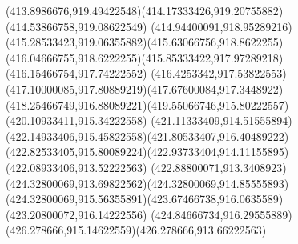 {{{{				\curveto(413.8986676,919.49422548)(414.17333426,919.20755882)(414.53866758,919.08622549)
				\curveto(414.94400091,918.95289216)(415.28533423,919.06355882)(415.63066756,918.8622255)
				\curveto(416.04666755,918.6222255)(415.85333422,917.97289218)(416.15466754,917.74222552)
				\curveto(416.4253342,917.53822553)(417.10000085,917.80889219)(417.67600084,917.3448922)
				\curveto(418.25466749,916.88089221)(419.55066746,915.80222557)(420.10933411,915.34222558)
				\curveto(421.11333409,914.51555894)(422.14933406,915.45822558)(421.80533407,916.40489222)
				\curveto(422.82533405,915.80089224)(422.93733404,914.11155895)(422.08933406,913.52222563)
				\curveto(422.88800071,913.3408923)(424.32800069,913.69822562)(424.32800069,914.85555893)
				\curveto(424.32800069,915.56355891)(423.67466738,916.0635589)(423.20800072,916.14222556)
				\curveto(424.84666734,916.29555889)(426.278666,915.14622559)(426.278666,913.66222563)
			}
		}
	}
}